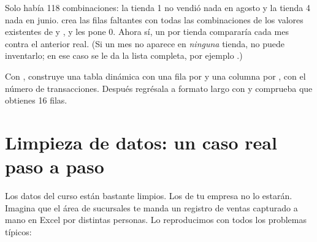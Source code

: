 Solo había 118 combinaciones: la tienda 1 no vendió nada en agosto y la
tienda 4 nada en junio.  crea las filas faltantes con
todas las combinaciones de los valores existentes de  y
, y  les pone 0. Ahora sí, un  por
tienda compararía cada mes contra el anterior real. (Si un mes no aparece en
\emph{ninguna} tienda,  no puede inventarlo; en ese caso
se le da la lista completa, por ejemplo .)

\begin{hazlotu}
Con , construye una tabla dinámica con una fila por
 y una columna por , con el número de
transacciones. Después regrésala a formato largo con
 y comprueba que obtienes 16 filas.
\end{hazlotu}

\section{Limpieza de datos: un caso real paso a paso}
\label{sec:m2-limpieza}

Los datos del curso están bastante limpios. Los de tu empresa no lo estarán.
Imagina que el área de sucursales te manda un registro de ventas capturado a
mano en Excel por distintas personas. Lo reproducimos con todos los
problemas típicos:

